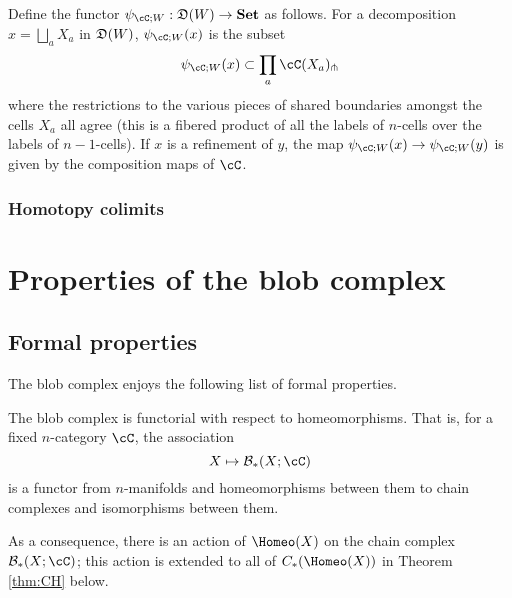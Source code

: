 \documentclass{pnastwo}
\begin{document}
\begin{article}
\begin{defn}
Define the functor $\psi_{\cC;W} : \cell(W) \to \Set$ as follows.
For a decomposition $x = \bigsqcup_a X_a$ in $\mathfrak{D}(W)$, $\psi_{\cC;W}(x)$ is the subset
\begin{equation*}
	\psi_{\cC;W}(x) \sub \prod_a \cC(X_a)\spl
\end{equation*}
where the restrictions to the various pieces of shared boundaries amongst the cells
$X_a$ all agree (this is a fibered product of all the labels of $n$-cells over the labels of $n-1$-cells).
If $x$ is a refinement of $y$, the map $\psi_{\cC;W}(x) \to \psi_{\cC;W}(y)$ is given by the composition maps of $\cC$.
\end{defn}


\subsubsection{Homotopy colimits}

\subsubsection{}
\section{Properties of the blob complex}
\subsection{Formal properties}
\label{sec:properties}
The blob complex enjoys the following list of formal properties.

\begin{property}[Functoriality]
\label{property:functoriality}%
The blob complex is functorial with respect to homeomorphisms.
That is, 
for a fixed $n$-category $\cC$, the association
\begin{equation*}
X \mapsto \bc_*(X; \cC)
\end{equation*}
is a functor from $n$-manifolds and homeomorphisms between them to chain 
complexes and isomorphisms between them.
\end{property}
As a consequence, there is an action of $\Homeo(X)$ on the chain complex $\bc_*(X; \cC)$; 
this action is extended to all of $C_*(\Homeo(X))$ in Theorem \ref{thm:CH} below.


\end{article}
\end{document}
